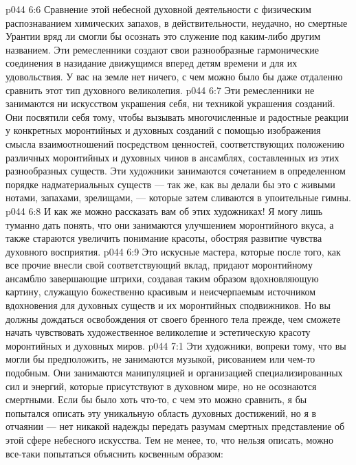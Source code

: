 \vs p044 6:6 \pc {}\bibnobreakspace {} Сравнение этой небесной духовной деятельности с физическим распознаванием химических запахов, в действительности, неудачно, но смертные Урантии вряд ли смогли бы осознать это служение под каким\hyp{}либо другим названием. Эти ремесленники создают свои разнообразные гармонические соединения в назидание движущимся вперед детям времени и для их удовольствия. У вас на земле нет ничего, с чем можно было бы даже отдаленно сравнить этот тип духовного великолепия.
\vs p044 6:7 \pc {}\bibnobreakspace {} Эти ремесленники не занимаются ни искусством украшения себя, ни техникой украшения созданий. Они посвятили себя тому, чтобы вызывать многочисленные и радостные реакции у конкретных моронтийных и духовных созданий с помощью изображения смысла взаимоотношений посредством ценностей, соответствующих положению различных моронтийных и духовных чинов в ансамблях, составленных из этих разнообразных существ. Эти художники занимаются сочетанием в определенном порядке надматериальных существ --- так же, как вы делали бы это с живыми нотами, запахами, зрелищами, --- которые затем сливаются в упоительные гимны.
\vs p044 6:8 \pc {}\bibnobreakspace {} И как же можно рассказать вам об этих художниках! Я могу лишь туманно дать понять, что они занимаются улучшением моронтийного вкуса, а также стараются увеличить понимание красоты, обостряя развитие чувства духовного восприятия.
\vs p044 6:9 \pc {}\bibnobreakspace {} Это искусные мастера, которые после того, как все прочие внесли свой соответствующий вклад, придают моронтийному ансамблю завершающие штрихи, создавая таким образом вдохновляющую картину, служащую божественно красивым и неисчерпаемым источником вдохновения для духовных существ и их моронтийных сподвижников. Но вы должны дождаться освобождения от своего бренного тела прежде, чем сможете начать чувствовать художественное великолепие и эстетическую красоту моронтийных и духовных миров.
\vs p044 7:1 Эти художники, вопреки тому, что вы могли бы предположить, не занимаются музыкой, рисованием или чем\hyp{}то подобным. Они занимаются манипуляцией и организацией специализированных сил и энергий, которые присутствуют в духовном мире, но не осознаются смертными. Если бы было хоть что\hyp{}то, с чем это можно сравнить, я бы попытался описать эту уникальную область духовных достижений, но я в отчаянии --- нет никакой надежды передать разумам смертных представление об этой сфере небесного искусства. Тем не менее, то, что нельзя описать, можно все\hyp{}таки попытаться объяснить косвенным образом:
